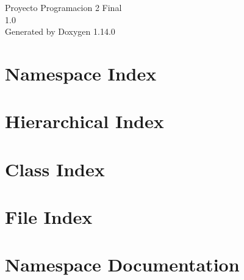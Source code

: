 \documentclass[twoside]{book}
\newcommand{\+}{\discretionary{\mbox{\scriptsize$\hookleftarrow$}}{}{}}
\newcommand{\clearemptydoublepage}{%
    \newpage{\pagestyle{empty}\cleardoublepage}%
  }
\begin{document}
  \raggedbottom
    \hypersetup{pageanchor=false,
                bookmarksnumbered=true,
                pdfencoding=unicode
               }
  \begin{titlepage}
  \vspace*{7cm}
  \begin{center}%
  {\Large Proyecto Programacion 2 Final}\\
  [1ex]\large 1.\+0 \\
  \vspace*{1cm}
  {\large Generated by Doxygen 1.14.0}\\
  \end{center}
  \end{titlepage}
  \clearemptydoublepage
  \tableofcontents
  \clearemptydoublepage
  \hypersetup{pageanchor=true}
\chapter{Namespace Index}

\chapter{Hierarchical Index}

\chapter{Class Index}

\chapter{File Index}

\chapter{Namespace Documentation}









\end{document}

